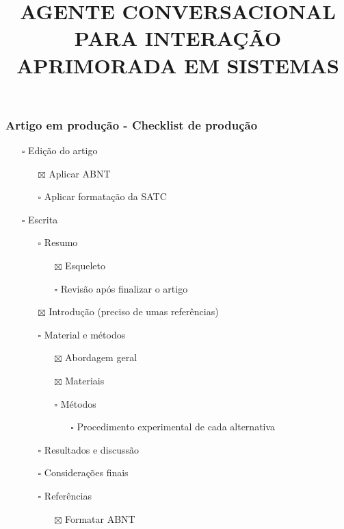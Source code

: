 \documentclass[
]{article}
\title{\textbf{AGENTE CONVERSACIONAL PARA INTERAÇÃO APRIMORADA EM
SISTEMAS}}
\author{}
\date{}
\providecommand{\tightlist}{%
  \setlength{\itemsep}{0pt}\setlength{\parskip}{0pt}}
\begin{document}
\maketitle

\subsubsection{Artigo em produção - Checklist de
produção}\label{artigo-em-produuxe7uxe3o---checklist-de-produuxe7uxe3o}

\begin{itemize}
\tightlist
\item[$\square$]
  Edição do artigo

  \begin{itemize}
  \tightlist
  \item[$\boxtimes$]
    Aplicar ABNT
  \item[$\square$]
    Aplicar formatação da SATC
  \end{itemize}
\item[$\square$]
  Escrita

  \begin{itemize}
  \tightlist
  \item[$\square$]
    Resumo

    \begin{itemize}
    \tightlist
    \item[$\boxtimes$]
      Esqueleto
    \item[$\square$]
      Revisão após finalizar o artigo
    \end{itemize}
  \item[$\boxtimes$]
    Introdução (preciso de umas referências)
  \item[$\square$]
    Material e métodos

    \begin{itemize}
    \tightlist
    \item[$\boxtimes$]
      Abordagem geral
    \item[$\boxtimes$]
      Materiais
    \item[$\square$]
      Métodos

      \begin{itemize}
      \tightlist
      \item[$\square$]
        Procedimento experimental de cada alternativa
      \end{itemize}
    \end{itemize}
  \item[$\square$]
    Resultados e discussão
  \item[$\square$]
    Considerações finais
  \item[$\square$]
    Referências

    \begin{itemize}
    \tightlist
    \item[$\boxtimes$]
      Formatar ABNT
    \end{itemize}
  \end{itemize}
\end{itemize}
\end{document}
